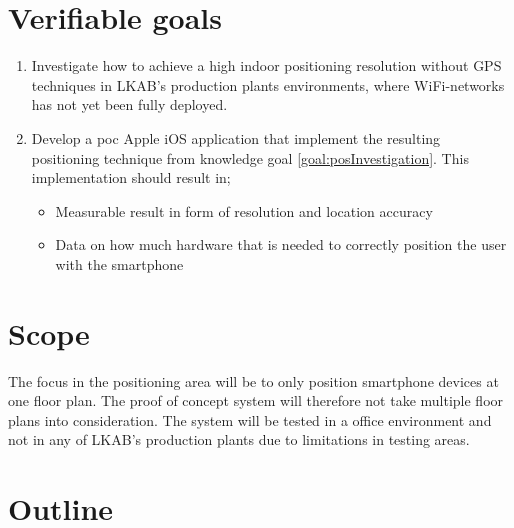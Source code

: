 \section{Verifiable goals}\label{sec:introGoals}
\begin{enumerate}
\item \label{goal:posInvestigation}
Investigate how to achieve a high indoor positioning resolution without GPS
techniques in LKAB's production plants environments, where WiFi-networks has
not yet been fully deployed.

\item \label{goal:poc}
Develop a \acrfull{poc} Apple iOS application that implement the resulting
positioning technique from knowledge goal \ref{goal:posInvestigation}. This
implementation should result in;
\begin{itemize}
\item Measurable result in form of resolution and location accuracy
\item Data on how much hardware that is needed to correctly position the user with the smartphone
\end{itemize}
\end{enumerate}


\section{Scope}
The focus in the positioning area will be to only position smartphone devices at one floor plan.
The proof of concept system will therefore not take multiple floor plans into consideration.
The system will be tested in a office environment and not in any of LKAB's production plants due to
limitations in testing areas.


\section{Outline}

